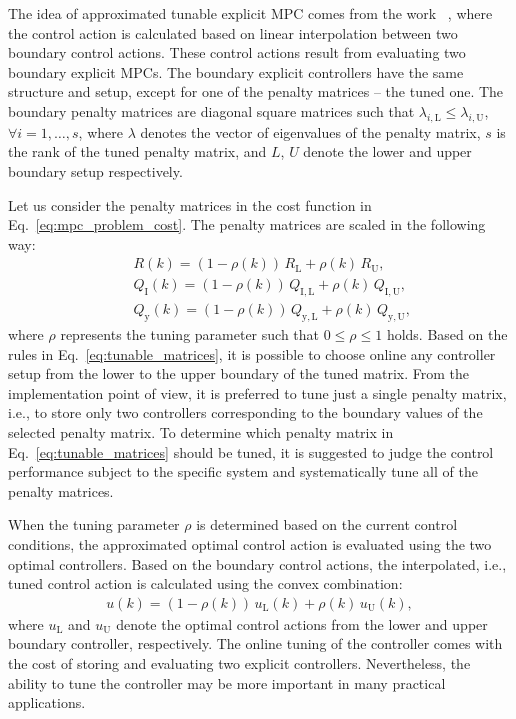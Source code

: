 \documentclass[preprint,12pt]{elsarticle}
\begin{document}
	The idea of approximated tunable explicit MPC comes from the work ~\cite{Klauco_tunable}, where the control action is calculated based on linear interpolation between two boundary control actions. These control actions result from evaluating two boundary explicit MPCs. The boundary explicit controllers have the same structure and setup, except for one of the penalty matrices -- the tuned one. The boundary penalty matrices are diagonal square matrices such that $\lambda_{i,\mathrm{L}} \le \lambda_{i,\mathrm{U}}$, $\forall i = 1,\dots,s$, where $\lambda$ denotes the vector of eigenvalues of the penalty matrix, $s$ is the rank of the tuned penalty matrix, and $L$, $U$ denote the lower and upper boundary setup respectively.
	
	Let us consider the penalty matrices in the cost function in Eq.~\eqref{eq:mpc_problem_cost}. The penalty matrices are scaled in the following way:
	\begin{subequations}
		\label{eq:tunable_matrices}
		\begin{eqnarray}
			\label{eq:tunable_R}
			&~& R(k) = (1-\rho(k)) \, R_\mathrm{L} + \rho(k) \, R_\mathrm{U}, \\
			\label{eq:tunable_Qx}
			&~& Q_\mathrm{I}(k) = (1-\rho(k)) \, Q_\mathrm{I,L} + \rho(k) \, Q_\mathrm{I,U}, \\
			\label{eq:tunable_Qy}
			&~& Q_\mathrm{y}(k) = (1-\rho(k)) \, Q_\mathrm{y,L} + \rho(k) \, Q_\mathrm{y,U},
		\end{eqnarray}
	\end{subequations}
	where $\rho$ represents the tuning parameter such that $0 \le \rho \le 1$ holds. Based on the rules in Eq.~\eqref{eq:tunable_matrices}, it is possible to choose online any controller setup from the lower to the upper boundary of the tuned matrix. From the implementation point of view, it is preferred to tune just a single penalty matrix, i.e., to store only two controllers corresponding to the boundary values of the selected penalty matrix. To determine which penalty matrix in Eq.~\eqref{eq:tunable_matrices} should be tuned, it is suggested to judge the control performance subject to the specific system and systematically tune all of the penalty matrices.
	
	When the tuning parameter $\rho$ is determined based on the current control conditions, the approximated optimal control action is evaluated using the two optimal controllers. Based on the boundary control actions, the interpolated, i.e., tuned control action is calculated using the convex combination:
		\begin{eqnarray}
			\label{eq:tunable_u}
			u(k) = (1-\rho(k)) \, u_\mathrm{L}(k) + \rho(k) \, u_\mathrm{U}(k),
		\end{eqnarray}
	where $u_\mathrm{L}$ and $u_\mathrm{U}$ denote the optimal control actions from the lower and upper boundary controller, respectively. The online tuning of the controller comes with the cost of storing and evaluating two explicit controllers. Nevertheless, the ability to tune the controller may be more important in many practical applications.
	
\end{document}
